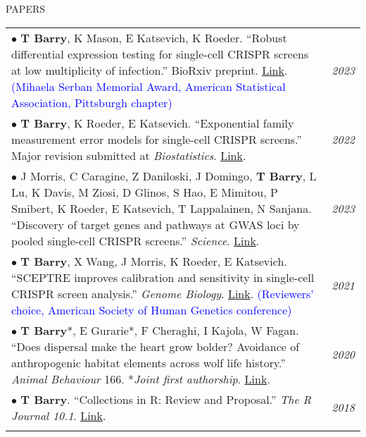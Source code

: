 \documentclass{resume} %
\begin{document}
\begin{rSection}{PAPERS}

\begin{tabular}{p{14cm}R{2.5cm}}
	$\bullet$ \textbf{T Barry}, K Mason, E Katsevich, K Roeder. ``Robust differential expression testing for single-cell CRISPR screens at low multiplicity of infection.'' BioRxiv preprint. \href{https://www.biorxiv.org/content/10.1101/2023.05.15.540875v1}{Link}. \textcolor{blue}{(Mihaela Serban Memorial Award, American Statistical Association, Pittsburgh chapter)}  & \textit{2023} \\
	$\bullet$ \textbf{T Barry}, K Roeder, E Katsevich. ``Exponential family measurement error models for single-cell CRISPR screens.'' Major revision submitted at \textit{Biostatistics}. \href{https://arxiv.org/abs/2201.01879}{Link}. & \textit{2022} \\
	 $\bullet$ J Morris, C Caragine, Z Daniloski, J Domingo, \textbf{T Barry}, L Lu, K Davis, M Ziosi, D Glinos, S Hao, E Mimitou, P Smibert, K Roeder, E Katsevich, T Lappalainen, N Sanjana. ``Discovery of target genes and pathways at GWAS loci by pooled single-cell CRISPR screens.'' \textit{Science}.  \href{https://www.science.org/doi/10.1126/science.adh7699}{Link}. %
	 & \textit{2023} 
	 \\
	$\bullet$ \textbf{T Barry}, X Wang, J Morris, K Roeder, E Katsevich. ``SCEPTRE improves calibration and sensitivity in single-cell CRISPR screen analysis.'' \textit{Genome Biology}. \href{https://genomebiology.biomedcentral.com/articles/10.1186/s13059-021-02545-2}{Link}. \textcolor{blue}{(Reviewers’ choice, American Society of Human Genetics conference)} 
	& \textit{2021}  
	\\
	$\bullet$ \textbf{T Barry}*, E Gurarie*, F Cheraghi, I Kajola, W Fagan. ``Does dispersal make the heart grow bolder? Avoidance of anthropogenic habitat elements across wolf life history.'' \textit{Animal Behaviour} 166. *\textit{Joint first authorship}. \href{https://www.sciencedirect.com/science/article/pii/S0003347220301743}{Link}. & \textit{2020}  \\
	$\bullet$ \textbf{T Barry}. ``Collections in R: Review and Proposal.'' \textit{The R Journal 10.1}. \href{https://journal.r-project.org/archive/2018/RJ-2018-037/index.html}{Link}. & \textit{2018} \\ &
\end{tabular} 	
\end{rSection}
\end{document}
